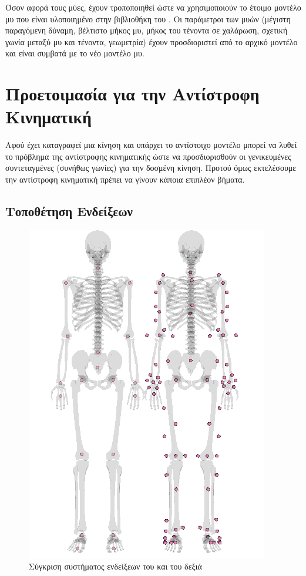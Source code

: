 Όσον αφορά τους μύες, έχουν τροποποιηθεί ώστε να χρησιμοποιούν το έτοιμο μοντέλο μυ  που είναι υλοποιημένο στην βιβλιοθήκη του . Οι παράμετροι των μυών (μέγιστη παραγόμενη δύναμη, βέλτιστο μήκος μυ, μήκος του τένοντα σε χαλάρωση, σχετική γωνία μεταξύ μυ και τένοντα, γεωμετρία) έχουν προσδιοριστεί από το αρχικό μοντέλο και είναι συμβατά με το νέο μοντέλο μυ.

\section{Προετοιμασία για την Αντίστροφη Κινηματική}

Αφού έχει καταγραφεί μια κίνηση και υπάρχει το αντίστοιχο μοντέλο μπορεί να λυθεί το πρόβλημα της αντίστροφης κινηματικής ώστε να προσδιορισθούν οι γενικευμένες συντεταγμένες (συνήθως γωνίες) για την δοσμένη κίνηση. Προτού όμως εκτελέσουμε την αντίστροφη κινηματική πρέπει να γίνουν κάποια επιπλέον βήματα.

\subsection{Τοποθέτηση Ενδείξεων}

\begin{figure}[H]
    \centering
    \includegraphics[height=0.6\textheight, keepaspectratio]{fig/kinect-vicon-markers.png}
    \caption{Σύγκριση συστήματος ενδείξεων του  και του  δεξιά}
    \label{fig:kinect-vicon-markers}
\end{figure}

